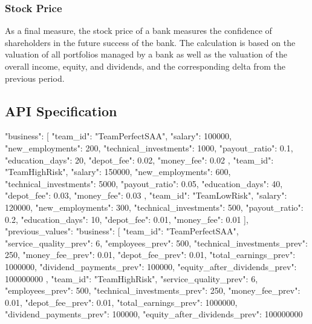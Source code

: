 \subsubsection{Stock Price}
As a final measure, the stock price of a bank measures the confidence of shareholders in the future success of the bank. The calculation is based on the  valuation of all portfolios managed by a bank as well as the valuation of the overall income, equity, and dividends, and the corresponding delta from the previous period.


\subsection{API Specification}

{
    "business": [
        {
            "team_id": "TeamPerfectSAA",
            "salary": 100000,
            "new_employments": 200,
            "technical_investments": 1000,
            "payout_ratio": 0.1,
            "education_days": 20,
            "depot_fee": 0.02,
            "money_fee": 0.02
        },
        {
            "team_id": "TeamHighRisk",
            "salary": 150000,
            "new_employments": 600,
            "technical_investments": 5000,
            "payout_ratio": 0.05,
            "education_days": 40,
            "depot_fee": 0.03,
            "money_fee": 0.03
        },
        {
            "team_id": "TeamLowRisk",
            "salary": 120000,
            "new_employments": 300,
            "technical_investments": 500,
            "payout_ratio": 0.2,
            "education_days": 10,
            "depot_fee": 0.01,
            "money_fee": 0.01
        }
    ],
    "previous_values": {
        "business": [
            {
                "team_id": "TeamPerfectSAA",
                "service_quality_prev": 6,
                "employees_prev": 500,
                "technical_investments_prev": 250,
                "money_fee_prev": 0.01,
                "depot_fee_prev": 0.01,
                "total_earnings_prev": 1000000,
                "dividend_payments_prev": 100000,
                "equity_after_dividends_prev": 100000000
            },
            {
                "team_id": "TeamHighRisk",
                "service_quality_prev": 6,
                "employees_prev": 500,
                "technical_investments_prev": 250,
                "money_fee_prev": 0.01,
                "depot_fee_prev": 0.01,
                "total_earnings_prev": 1000000,
                "dividend_payments_prev": 100000,
                "equity_after_dividends_prev": 100000000
}}}
